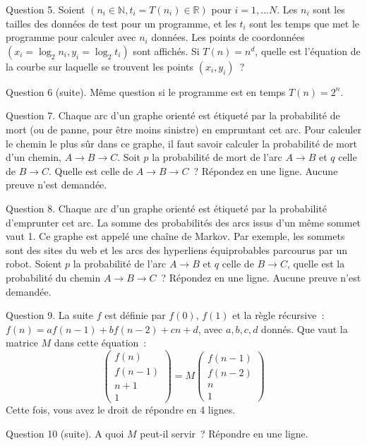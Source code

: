 \documentclass[a4paper,12pt]{article}
\def\N{\mathbb{N}}
\def\R{\mathbb{R}}
\begin{document}


Question 5. Soient $(n_i\in\N, t_i=T(n_i)\in \R)$ pour $i=1, \ldots N$. Les $n_i$ sont les
tailles des données de test pour un programme, et les $t_i$ sont les temps que met le programme pour calculer avec $n_i$ données.  
Les points de coordonnées $(x_i=\log_2 n_i, y_i=\log_2 t_i)$ sont affichés.
Si $T(n)=n^d$, quelle est l'équation de la courbe
sur laquelle se trouvent les points $(x_i, y_i)$~?  

Question 6 (suite). Même question si le programme est en temps $T(n)=2^n$.

Question 7. Chaque arc d'un graphe orienté est étiqueté par la probabilité de  mort (ou de panne, pour être moins sinistre)  en empruntant cet arc. 
Pour calculer le chemin le plus sûr dans ce graphe, il faut savoir calculer la probabilité de mort d'un chemin,  $A \rightarrow B \rightarrow C$.
Soit $p$ la probabilité de mort de l'arc  $A \rightarrow B$ et $q$ celle
de $B \rightarrow C$. Quelle est celle de  $A \rightarrow B \rightarrow C$~?
Répondez en une ligne. Aucune preuve n'est demandée.

Question 8.  Chaque arc d'un graphe orienté est étiqueté par la probabilité d'emprunter cet arc. La somme des probabilités des arcs issus d'un même sommet vaut 1. Ce graphe est appelé une chaîne de Markov. Par exemple, les sommets sont des sites du web et les arcs des hyperliens équiprobables parcourus par un robot. Soient $p$ la probabilité de l'arc  $A \rightarrow B$ et $q$ celle
de $B \rightarrow C$, quelle est la probabilité du chemin $A \rightarrow B \rightarrow C$~?
Répondez en une ligne. Aucune preuve n'est demandée.
  
Question 9. La suite $f$ est définie par $f(0)$, $f(1)$ et la règle récursive~:
$f(n)=a f(n-1) + b f(n-2) + cn + d$, avec $a, b, c, d$ donnés.
Que vaut la matrice $M$ dans cette équation~:
$$ \left(\begin{array}{l} f(n) \\
f(n-1) \\
n+1 \\
1
\end{array}\right)= M \left(\begin{array}{l} f(n-1)  \\
f(n-2) \\
n \\
1
\end{array}\right)$$ 
Cette fois, vous avez le droit de répondre en 4 lignes.

Question 10 (suite). A quoi $M$ peut-il servir~?  Répondre en une ligne.
\end{document}
